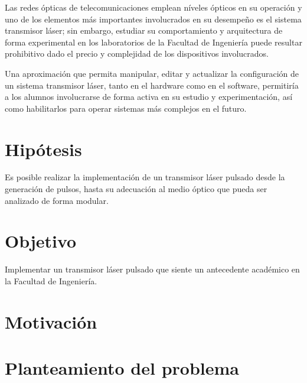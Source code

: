 Las redes ópticas de telecomunicaciones emplean níveles ópticos en su operación y uno de los elementos más importantes involucrados en su desempeño es el sistema transmisor láser; sin embargo, estudiar su comportamiento y arquitectura de forma experimental en los laboratorios de la Facultad de Ingeniería puede resultar prohibitivo dado el precio y complejidad de los dispositivos involucrados.

Una aproximación que permita manipular, editar y  actualizar la configuración de un sistema transmisor láser, tanto en el hardware como en el software, permitiría a los alumnos involucrarse de forma activa en su estudio y experimentación, así como habilitarlos para operar sistemas más complejos en el futuro.

\section{Hipótesis}

Es posible realizar la implementación de un transmisor láser pulsado desde la generación de pulsos, hasta su adecuación al medio óptico que pueda ser analizado de forma modular.

\section{Objetivo}

Implementar un transmisor láser pulsado  que siente un antecedente académico en la Facultad de Ingeniería.



 \blindtext
\section{Motivación}


\blindtext

\section{Planteamiento del problema}
\blindtext

